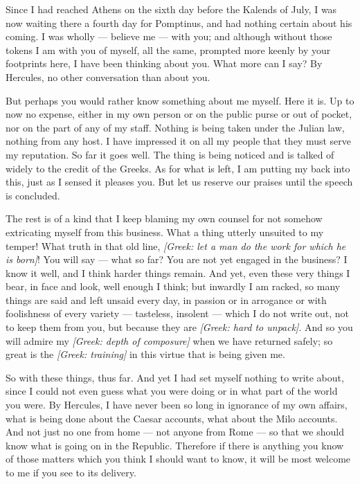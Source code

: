 

 Since I had reached Athens on the sixth day before the Kalends of July, I was now waiting there a fourth day for Pomptinus, and had nothing certain about his coming. I was wholly --- believe me --- with you; and although without those tokens I am with you of myself, all the same, prompted more keenly by your footprints here, I have been thinking about you. What more can I say? By Hercules, no other conversation than about you.

 But perhaps you would rather know something about me myself. Here it is. Up to now no expense, either in my own person or on the public purse or out of pocket, nor on the part of any of my staff. Nothing is being taken under the Julian law, nothing from any host. I have impressed it on all my people that they must serve my reputation. So far it goes well. The thing is being noticed and is talked of widely to the credit of the Greeks. As for what is left, I am putting my back into this, just as I sensed it pleases you. But let us reserve our praises until the speech is concluded.

 The rest is of a kind that I keep blaming my own counsel for not somehow extricating myself from this business. What a thing utterly unsuited to my temper! What truth in that old line, \textit{[Greek: let a man do the work for which he is born]}! You will say --- what so far? You are not yet engaged in the business? I know it well, and I think harder things remain. And yet, even these very things I bear, in face and look, well enough I think; but inwardly I am racked, so many things are said and left unsaid every day, in passion or in arrogance or with foolishness of every variety --- tasteless, insolent --- which I do not write out, not to keep them from you, but because they are \textit{[Greek: hard to unpack]}. And so you will admire my \textit{[Greek: depth of composure]} when we have returned safely; so great is the \textit{[Greek: training]} in this virtue that is being given me.

 So with these things, thus far. And yet I had set myself nothing to write about, since I could not even guess what you were doing or in what part of the world you were. By Hercules, I have never been so long in ignorance of my own affairs, what is being done about the Caesar accounts, what about the Milo accounts. And not just no one from home --- not anyone from Rome --- so that we should know what is going on in the Republic. Therefore if there is anything you know of those matters which you think I should want to know, it will be most welcome to me if you see to its delivery.

